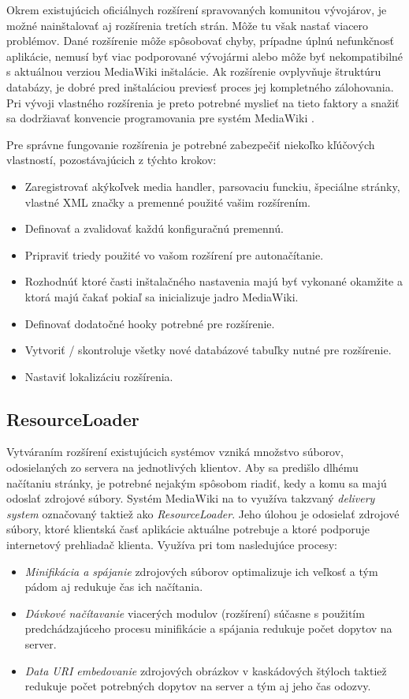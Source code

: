Okrem existujúcich oficiálnych rozšírení spravovaných komunitou vývojárov, je možné nainštalovať aj rozšírenia tretích strán. Môže tu však nastať viacero problémov. Dané rozšírenie môže spôsobovať chyby, prípadne úplnú nefunkčnosť aplikácie, nemusí byť viac podporované vývojármi alebo môže byť nekompatibilné s aktuálnou verziou MediaWiki inštalácie. Ak rozšírenie ovplyvňuje štruktúru databázy, je dobré pred inštaláciou previesť proces jej kompletného zálohovania. Pri vývoji vlastného rozšírenia je preto potrebné myslieť na tieto faktory a snažiť sa dodržiavať konvencie programovania pre systém MediaWiki \cite{MediaWikiConventions}. 

Pre správne fungovanie rozšírenia je potrebné zabezpečiť niekoľko kľúčových vlastností, pozostávajúcich z týchto krokov:
\begin{itemize}
	\item Zaregistrovať akýkoľvek media handler, parsovaciu funckiu, špeciálne stránky, vlastné XML značky a premenné použité vašim rozšírením.
	\item Definovať a zvalidovať každú konfiguračnú premennú.
	\item Pripraviť triedy použité vo vašom rozšírení pre autonačítanie.
	\item Rozhodnúť ktoré časti inštalačného nastavenia majú byť vykonané okamžite a ktorá majú čakať pokiaľ sa inicializuje jadro MediaWiki.
	\item Definovať dodatočné hooky potrebné pre rozšírenie.
	\item Vytvoriť / skontroluje všetky nové databázové tabuľky nutné pre rozšírenie.
	\item Nastaviť lokalizáciu rozšírenia.
\end{itemize}

\subsection{ResourceLoader}
Vytváraním rozšírení existujúcich systémov vzniká množstvo súborov, odosielaných zo servera na jednotlivých klientov. Aby sa predišlo dlhému načítaniu stránky, je potrebné nejakým spôsobom riadiť, kedy a komu sa majú odoslať zdrojové súbory. Systém MediaWiki na to využíva takzvaný \textit{delivery system} označovaný taktiež ako \textit{ResourceLoader}. Jeho úlohou je odosielať zdrojové súbory, ktoré klientská časť aplikácie aktuálne potrebuje a ktoré podporuje internetový prehliadač klienta. Využíva pri tom nasledujúce procesy:

\begin{itemize}
	\item \textit{Minifikácia a spájanie} zdrojových súborov optimalizuje ich veľkosť a tým pádom aj redukuje čas ich načítania.
	\item \textit{Dávkové načítavanie} viacerých modulov (rozšírení) súčasne s použitím predchádzajúceho procesu minifikácie a spájania redukuje počet dopytov na server.
	\item \textit{Data URI embedovanie} zdrojových obrázkov v kaskádových štýloch taktiež redukuje počet potrebných dopytov na server a tým aj jeho čas odozvy.
\end{itemize}

